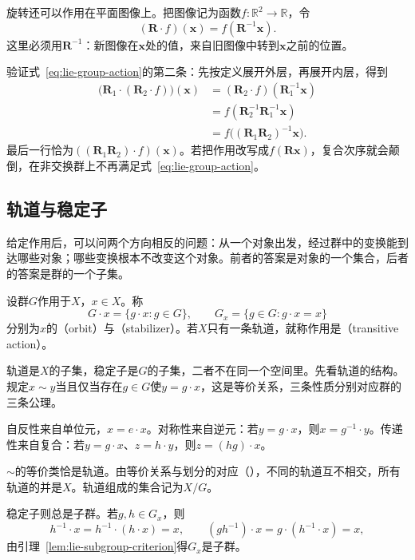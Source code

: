 旋转还可以作用在平面图像上。把图像记为函数$f:\mathbb R^2\to\mathbb R$，令
\[
(\bm R\cdot f)(\bm x)=f(\bm R^{-1}\bm x).
\]
这里必须用$\bm R^{-1}$：新图像在$\bm x$处的值，来自旧图像中转到$\bm x$之前的位置。

验证式~\eqref{eq:lie-group-action}的第二条：先按定义展开外层，再展开内层，得到
\[
\begin{aligned}
\bigl(\bm R_1\cdot(\bm R_2\cdot f)\bigr)(\bm x)
&=(\bm R_2\cdot f)(\bm R_1^{-1}\bm x)\\
&=f(\bm R_2^{-1}\bm R_1^{-1}\bm x)\\
&=f\bigl((\bm R_1\bm R_2)^{-1}\bm x\bigr).
\end{aligned}
\]
最后一行恰为$((\bm R_1\bm R_2)\cdot f)(\bm x)$。若把作用改写成$f(\bm R\bm x)$，复合次序就会颠倒，在非交换群上不再满足式~\eqref{eq:lie-group-action}。

\subsection{轨道与稳定子}
\label{sec:lie-orbits-stabilizers}

给定作用后，可以问两个方向相反的问题：从一个对象出发，经过群中的变换能到达哪些对象；哪些变换根本不改变这个对象。前者的答案是对象的一个集合，后者的答案是群的一个子集。

\begin{definition}[轨道与稳定子]
\label{def:lie-orbit-stabilizer}
设群$G$作用于$X$，$x\in X$。称
\begin{equation}
 G\cdot x=\{g\cdot x:g\in G\},\qquad G_x=\{g\in G:g\cdot x=x\}
 \label{eq:lie-orbit-stabilizer}
\end{equation}
分别为$x$的（orbit）与（stabilizer）。若$X$只有一条轨道，就称作用是（transitive action）。
\end{definition}

轨道是$X$的子集，稳定子是$G$的子集，二者不在同一个空间里。先看轨道的结构。规定$x\sim y$当且仅当存在$g\in G$使$y=g\cdot x$，这是等价关系，三条性质分别对应群的三条公理。

自反性来自单位元，$x=e\cdot x$。对称性来自逆元：若$y=g\cdot x$，则$x=g^{-1}\cdot y$。传递性来自复合：若$y=g\cdot x$、$z=h\cdot y$，则$z=(hg)\cdot x$。

$\sim$的等价类恰是轨道。由等价关系与划分的对应（），不同的轨道互不相交，所有轨道的并是$X$。轨道组成的集合记为$X/G$。

稳定子则总是子群。若$g,h\in G_x$，则
\[
h^{-1}\cdot x=h^{-1}\cdot(h\cdot x)=x,\qquad
(gh^{-1})\cdot x=g\cdot(h^{-1}\cdot x)=x,
\]
由引理~\ref{lem:lie-subgroup-criterion}得$G_x$是子群。

